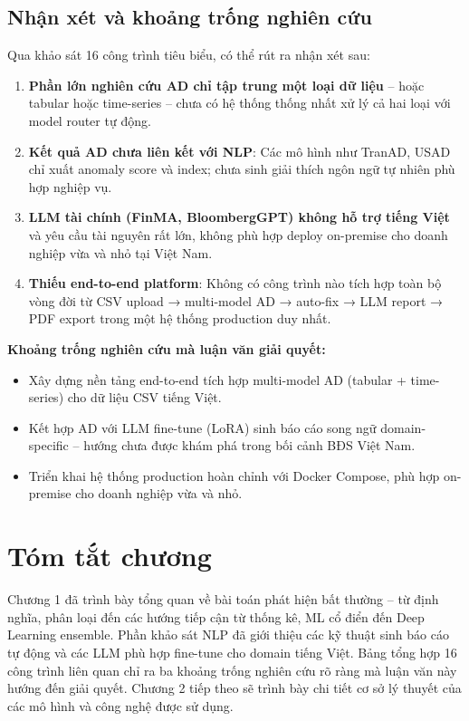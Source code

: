 \subsection{Nhận xét và khoảng trống nghiên cứu}

Qua khảo sát 16 công trình tiêu biểu, có thể rút ra nhận xét sau:

\begin{enumerate}
  \item \textbf{Phần lớn nghiên cứu AD chỉ tập trung một loại dữ liệu} -- hoặc tabular hoặc time-series -- chưa có hệ thống thống nhất xử lý cả hai loại với model router tự động.

  \item \textbf{Kết quả AD chưa liên kết với NLP}: Các mô hình như TranAD, USAD chỉ xuất anomaly score và index; chưa sinh giải thích ngôn ngữ tự nhiên phù hợp nghiệp vụ.

  \item \textbf{LLM tài chính (FinMA, BloombergGPT) không hỗ trợ tiếng Việt} và yêu cầu tài nguyên rất lớn, không phù hợp deploy on-premise cho doanh nghiệp vừa và nhỏ tại Việt Nam.

  \item \textbf{Thiếu end-to-end platform}: Không có công trình nào tích hợp toàn bộ vòng đời từ CSV upload → multi-model AD → auto-fix → LLM report → PDF export trong một hệ thống production duy nhất.
\end{enumerate}

\textbf{Khoảng trống nghiên cứu mà luận văn giải quyết:}
\begin{itemize}
  \item Xây dựng nền tảng end-to-end tích hợp multi-model AD (tabular + time-series) cho dữ liệu CSV tiếng Việt.
  \item Kết hợp AD với LLM fine-tune (LoRA) sinh báo cáo song ngữ domain-specific -- hướng chưa được khám phá trong bối cảnh BĐS Việt Nam.
  \item Triển khai hệ thống production hoàn chỉnh với Docker Compose, phù hợp on-premise cho doanh nghiệp vừa và nhỏ.
\end{itemize}

\section{Tóm tắt chương}

Chương 1 đã trình bày tổng quan về bài toán phát hiện bất thường -- từ định nghĩa, phân loại đến các hướng tiếp cận từ thống kê, ML cổ điển đến Deep Learning ensemble. Phần khảo sát NLP đã giới thiệu các kỹ thuật sinh báo cáo tự động và các LLM phù hợp fine-tune cho domain tiếng Việt. Bảng tổng hợp 16 công trình liên quan chỉ ra ba khoảng trống nghiên cứu rõ ràng mà luận văn này hướng đến giải quyết. Chương 2 tiếp theo sẽ trình bày chi tiết cơ sở lý thuyết của các mô hình và công nghệ được sử dụng.
